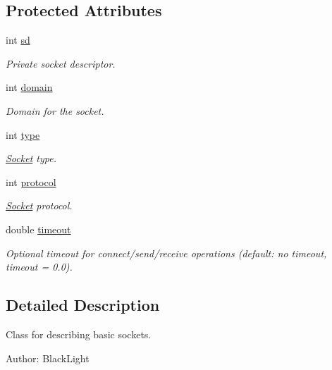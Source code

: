 \subsection*{Protected Attributes}
\begin{CompactItemize}
\item 
int \hyperlink{classusock_1_1BaseSocket_63b6c07fb14f937056148cbf8b3531c5}{sd}
\begin{CompactList}\small\item\em Private socket descriptor. \item\end{CompactList}\item 
int \hyperlink{classusock_1_1BaseSocket_9a7414d934aeccd1340292214a2aef0e}{domain}
\begin{CompactList}\small\item\em Domain for the socket. \item\end{CompactList}\item 
int \hyperlink{classusock_1_1BaseSocket_139a74d163977332762f349a73f4bd64}{type}
\begin{CompactList}\small\item\em \hyperlink{classusock_1_1Socket}{Socket} type. \item\end{CompactList}\item 
int \hyperlink{classusock_1_1BaseSocket_91b9f72f183b6314891f7e1f93ead99a}{protocol}
\begin{CompactList}\small\item\em \hyperlink{classusock_1_1Socket}{Socket} protocol. \item\end{CompactList}\item 
double \hyperlink{classusock_1_1BaseSocket_b419e8fd0b849c74b73a02d6bd9081e3}{timeout}
\begin{CompactList}\small\item\em Optional timeout for connect/send/receive operations (default: no timeout, timeout = 0.0). \item\end{CompactList}\end{CompactItemize}


\subsection{Detailed Description}
Class for describing basic sockets. 

\begin{Desc}
\item[Author:]BlackLight \end{Desc}


